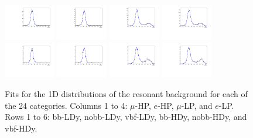 \begin{figure}[htbp]
  \includegraphics[width=0.2\textwidth]{fig/2Dfit/LNuJJ_res_MJJ_mu_HP_nobb_HDy.pdf}
  \includegraphics[width=0.2\textwidth]{fig/2Dfit/LNuJJ_res_MJJ_e_HP_nobb_HDy.pdf}
  \includegraphics[width=0.2\textwidth]{fig/2Dfit/LNuJJ_res_MJJ_mu_LP_nobb_HDy.pdf}
  \includegraphics[width=0.2\textwidth]{fig/2Dfit/LNuJJ_res_MJJ_e_LP_nobb_HDy.pdf}\\
  \includegraphics[width=0.2\textwidth]{fig/2Dfit/LNuJJ_res_MJJ_mu_HP_vbf_HDy.pdf}
  \includegraphics[width=0.2\textwidth]{fig/2Dfit/LNuJJ_res_MJJ_e_HP_vbf_HDy.pdf}
  \includegraphics[width=0.2\textwidth]{fig/2Dfit/LNuJJ_res_MJJ_mu_LP_vbf_HDy.pdf}
  \includegraphics[width=0.2\textwidth]{fig/2Dfit/LNuJJ_res_MJJ_e_LP_vbf_HDy.pdf}\\
  \caption{
    Fits for the 1D \MJ distributions of the resonant background for each of the 24 categories.
    Columns 1 to 4: $\mu$-HP, $e$-HP, $\mu$-LP, and $e$-LP.
    Rows 1 to 6: bb-LDy, nobb-LDy, vbf-LDy, bb-HDy, nobb-HDy, and vbf-HDy.
  }
  \label{fig:fits_res_MJJ_Run2}
\end{figure}

